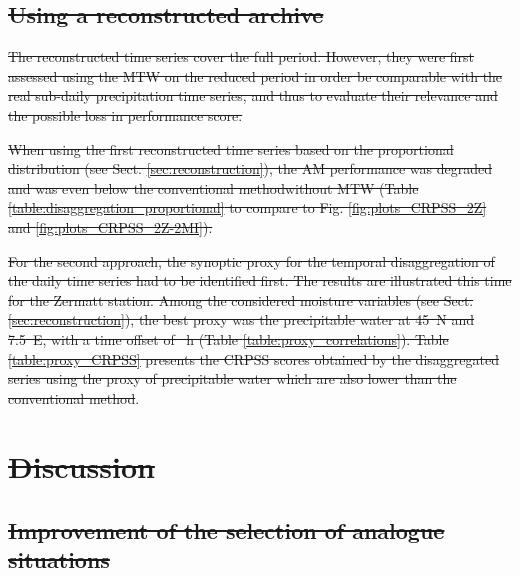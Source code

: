 \documentclass[hess, manuscript]{copernicus}
\providecommand{\DIFadd}[1]{{\protect\color{blue}\uwave{#1}}} %
\providecommand{\DIFdel}[1]{{\protect\color{red}\sout{#1}}}                      %
\providecommand{\DIFaddbegin}{} %
\providecommand{\DIFaddend}{} %
\providecommand{\DIFdelbegin}{} %
\providecommand{\DIFdelend}{} %
\begin{document}
\subsection{\DIFdel{Using a reconstructed archive}}
\addtocounter{subsection}{-1}%

\DIFdel{The reconstructed time series cover the full period. However, they were first assessed using the MTW on the reduced period in order be comparable with the real sub-daily precipitation time series, and thus to evaluate their relevance and the possible loss in performance score. }%

\DIFdel{When using the first reconstructed time series based on the proportional distribution (see Sect. \ref{sec:reconstruction}), the AM performance was degraded and was even below the conventional methodwithout MTW (Table \ref{table:disaggregation_proportional} to compare to Fig. \ref{fig:plots_CRPSS_2Z} and \ref{fig:plots_CRPSS_2Z-2MI}).
	}%

\DIFdel{For the second approach, the synoptic proxy for the temporal disaggregation of the daily time series had to be identified first. The results are illustrated this time for the Zermatt station. Among the considered moisture variables (see Sect. \ref{sec:reconstruction}), the best proxy was the precipitable water at 45\textdegree\ N and 7.5\textdegree\ E, with a time offset of \textendash 6~h (Table \ref{table:proxy_correlations}). Table \ref{table:proxy_CRPSS} presents the CRPSS scores obtained by the disaggregated series using the proxy of precipitable water which are also lower than the conventional method}\DIFdelend \DIFaddbegin \DIFadd{the MERRA-2 dataset}\DIFaddend .

	\DIFdelbegin \section{\DIFdel{Discussion}}
\addtocounter{section}{-1}%

\subsection{\DIFdel{Improvement of the selection of analogue situations}}
\addtocounter{subsection}{-1}%
\end{document}
